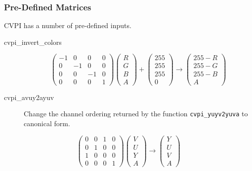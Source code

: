 \documentclass[12pt]{report}
\begin{document}
\subsubsection{Pre-Defined Matrices}
CVPI has a number of pre-defined inputs.
\begin{description}
\item [{cvpi\_invert\_colors}]
      \[
 \begin{pmatrix} -1 & 0 & 0 &
 0 \\ 0 & -1 & 0 & 0 \\ 0 & 0 & -1 & 0 \\ 0 & 0 & 0 & 1 \end{pmatrix}
          \begin{pmatrix} R \\ G \\ B \\ A \end{pmatrix}
          + \begin{pmatrix} 255 \\ 255 \\ 255 \\ 0 \end{pmatrix} \to \begin{pmatrix} 255
  - R \\ 255 - G \\ 255 - B \\ A \end{pmatrix}
\]
\end{description}

\begin{description}
\item[{cvpi\_avuy2ayuv}] Change the channel ordering returned by the function
                        {\tt cvpi\_yuyv2yuva} to canonical form.
\end{description}
    \[
 \begin{pmatrix} 0 & 0 & 1 &
 0 \\ 0 & 1 & 0 & 0 \\ 1 & 0 & 0 & 0 \\ 0 & 0 & 0 & 1 \end{pmatrix}
          \begin{pmatrix} V \\ U \\ Y \\ A \end{pmatrix} \to \begin{pmatrix} Y \\ U \\ V \\ A \end{pmatrix}
\]
\end{document}
